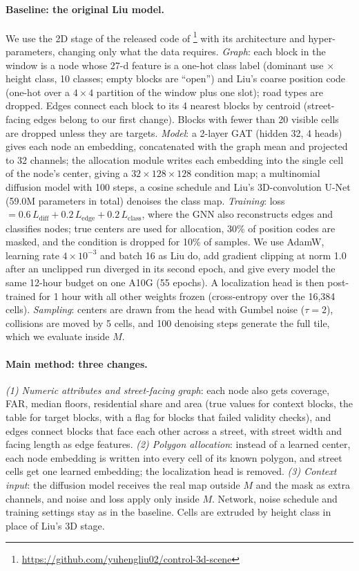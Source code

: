 \documentclass[twocolumn,11pt]{article}
\begin{document}
\paragraph{Baseline: the original Liu model.} We use the 2D stage of the released code of \citet{liu2025controllable}\footnote{\url{https://github.com/yuhengliu02/control-3d-scene}} with its architecture and hyper-parameters, changing only what the data requires. \emph{Graph}: each block in the window is a node whose 27-d feature is a one-hot class label (dominant use $\times$ height class, 10 classes; empty blocks are ``open'') and Liu's coarse position code (one-hot over a $4\times4$ partition of the window plus one slot); road types are dropped. Edges connect each block to its 4 nearest blocks by centroid (street-facing edges belong to our first change). Blocks with fewer than 20 visible cells are dropped unless they are targets. \emph{Model}: a 2-layer GAT (hidden 32, 4 heads) gives each node an embedding, concatenated with the graph mean and projected to 32 channels; the allocation module writes each embedding into the single cell of the node's center, giving a $32\times128\times128$ condition map; a multinomial diffusion model \citep{hoogeboom2021argmax} with 100 steps, a cosine schedule and Liu's 3D-convolution U-Net (59.0M parameters in total) denoises the class map. \emph{Training}: loss $=0.6\,L_\text{diff}+0.2\,L_\text{edge}+0.2\,L_\text{class}$, where the GNN also reconstructs edges and classifies nodes; true centers are used for allocation, 30\% of position codes are masked, and the condition is dropped for 10\% of samples. We use AdamW, learning rate $4\times10^{-3}$ and batch 16 as Liu do, add gradient clipping at norm 1.0 after an unclipped run diverged in its second epoch, and give every model the same 12-hour budget on one A10G (55 epochs). A localization head is then post-trained for 1 hour with all other weights frozen (cross-entropy over the 16,384 cells). \emph{Sampling}: centers are drawn from the head with Gumbel noise ($\tau=2$), collisions are moved by 5 cells, and 100 denoising steps generate the full tile, which we evaluate inside $M$.

\paragraph{Main method: three changes.} \emph{(1) Numeric attributes and street-facing graph}: each node also gets coverage, FAR, median floors, residential share and area (true values for context blocks, the table for target blocks, with a flag for blocks that failed validity checks), and edges connect blocks that face each other across a street, with street width and facing length as edge features. \emph{(2) Polygon allocation}: instead of a learned center, each node embedding is written into every cell of its known polygon, and street cells get one learned embedding; the localization head is removed. \emph{(3) Context input}: the diffusion model receives the real map outside $M$ and the mask as extra channels, and noise and loss apply only inside $M$. Network, noise schedule and training settings stay as in the baseline. Cells are extruded by height class in place of Liu's 3D stage.
\end{document}
